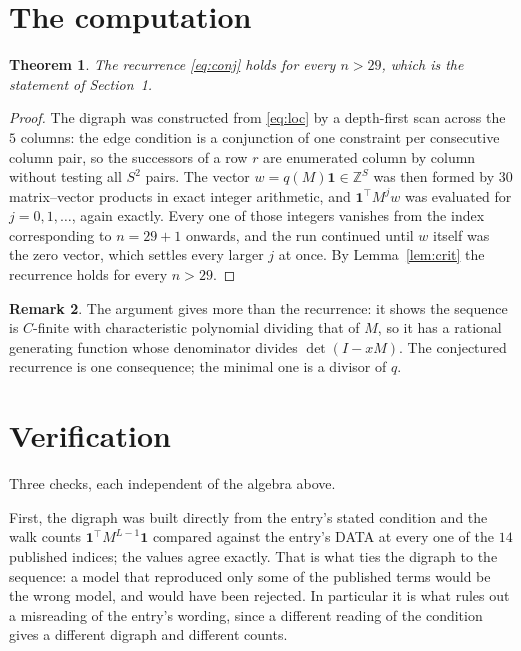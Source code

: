 \documentclass[11pt,a4paper]{article}
\theoremstyle{plain}
\newtheorem{theorem}{Theorem}
\theoremstyle{definition}
\newtheorem{remark}[theorem]{Remark}
\begin{document}
\section{The computation}

\begin{theorem}
The recurrence \eqref{eq:conj} holds for every $n>29$, which is the statement of
Section~1.
\end{theorem}

\begin{proof}
The digraph was constructed from \eqref{eq:loc} by a depth-first scan across the $5$
columns: the edge condition is a conjunction of one constraint per consecutive column
pair, so the successors of a row $r$ are enumerated column by column without testing all
$S^2$ pairs. The vector $w=q(M)\mathbf{1}\in\mathbb{Z}^{S}$ was then formed by $30$
matrix--vector products in exact integer arithmetic, and $\mathbf{1}^{\!\top}M^{j}w$ was
evaluated for $j=0,1,\dots$, again exactly. Every one of those integers vanishes from the
index corresponding to $n=29+1$ onwards, and the run continued until $w$ itself was the
zero vector, which settles every larger $j$ at once. By Lemma~\ref{lem:crit} the recurrence
holds for every $n>29$.
\end{proof}

\begin{remark}
The argument gives more than the recurrence: it shows the sequence is $C$-finite with
characteristic polynomial dividing that of $M$, so it has a rational generating function
whose denominator divides $\det(I-xM)$. The conjectured recurrence is one consequence; the
minimal one is a divisor of $q$.
\end{remark}

\section{Verification}

Three checks, each independent of the algebra above.

First, the digraph was built directly from the entry's stated condition and the walk counts
$\mathbf{1}^{\!\top}M^{L-1}\mathbf{1}$ compared against the entry's DATA at
every one of the $14$ published indices; the values agree exactly. That is what ties
the digraph to the sequence: a model that reproduced only some of the published terms would
be the wrong model, and would have been rejected. In particular it is what rules out a
misreading of the entry's wording, since a different reading of the condition gives a
different digraph and different counts.
\end{document}
